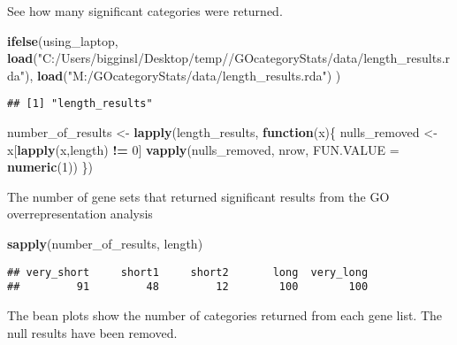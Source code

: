 \documentclass[]{article}
\newenvironment{Shaded}{\begin{snugshade}}{\end{snugshade}}
\newcommand{\KeywordTok}[1]{\textcolor[rgb]{0.13,0.29,0.53}{\textbf{#1}}}
\newcommand{\DataTypeTok}[1]{\textcolor[rgb]{0.13,0.29,0.53}{#1}}
\newcommand{\DecValTok}[1]{\textcolor[rgb]{0.00,0.00,0.81}{#1}}
\newcommand{\StringTok}[1]{\textcolor[rgb]{0.31,0.60,0.02}{#1}}
\newcommand{\ControlFlowTok}[1]{\textcolor[rgb]{0.13,0.29,0.53}{\textbf{#1}}}
\newcommand{\OperatorTok}[1]{\textcolor[rgb]{0.81,0.36,0.00}{\textbf{#1}}}
\newcommand{\NormalTok}[1]{#1}
\begin{document}
See how many significant categories were returned.

\begin{Shaded}
\begin{Highlighting}[]
\KeywordTok{ifelse}\NormalTok{(using_laptop,}
       \KeywordTok{load}\NormalTok{(}\StringTok{"C:/Users/bigginsl/Desktop/temp//GOcategoryStats/data/length_results.rda"}\NormalTok{),}
       \KeywordTok{load}\NormalTok{(}\StringTok{"M:/GOcategoryStats/data/length_results.rda"}\NormalTok{)}
\NormalTok{)}
\end{Highlighting}
\end{Shaded}

\begin{verbatim}
## [1] "length_results"
\end{verbatim}

\begin{Shaded}
\begin{Highlighting}[]
\NormalTok{number_of_results <-}\StringTok{ }\KeywordTok{lapply}\NormalTok{(length_results, }\ControlFlowTok{function}\NormalTok{(x)\{}
\NormalTok{  nulls_removed <-}\StringTok{ }\NormalTok{x[}\KeywordTok{lapply}\NormalTok{(x,length) }\OperatorTok{!=}\StringTok{ }\DecValTok{0}\NormalTok{]}
  \KeywordTok{vapply}\NormalTok{(nulls_removed, nrow, }\DataTypeTok{FUN.VALUE =} \KeywordTok{numeric}\NormalTok{(}\DecValTok{1}\NormalTok{))}
\NormalTok{\})  }
\end{Highlighting}
\end{Shaded}

The number of gene sets that returned significant results from the GO
overrepresentation analysis

\begin{Shaded}
\begin{Highlighting}[]
\KeywordTok{sapply}\NormalTok{(number_of_results, length)}
\end{Highlighting}
\end{Shaded}

\begin{verbatim}
## very_short     short1     short2       long  very_long 
##         91         48         12        100        100
\end{verbatim}

The bean plots show the number of categories returned from each gene
list. The null results have been removed.
\end{document}
